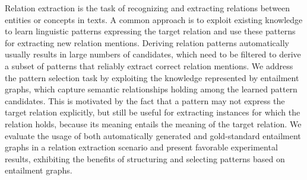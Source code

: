 Relation extraction is the task of recognizing and extracting relations between entities or concepts in texts. A common approach is to exploit existing knowledge to learn linguistic patterns expressing the target relation and use these patterns for extracting new relation mentions. Deriving relation patterns automatically usually results in large numbers of candidates, which need to be filtered to derive a subset of patterns that reliably extract correct relation mentions. We address the pattern selection task by exploiting the knowledge represented by entailment graphs, which capture semantic relationships holding among the learned pattern candidates. This is motivated by the fact that a pattern may not express the target relation explicitly, but still be useful for extracting instances for which the relation holds, because its meaning entails the meaning of the target relation. We evaluate the usage of both automatically generated and gold-standard entailment graphs in a relation extraction scenario and present favorable experimental results, exhibiting the benefits of structuring and selecting patterns based on entailment graphs.
